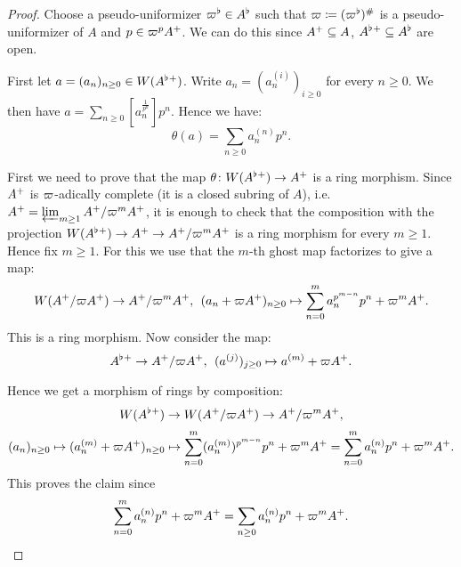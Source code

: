 \begin{proof}
Choose a pseudo-uniformizer $\varpi^{\flat}\in A^{\flat}$ such that $\varpi\coloneqq (\varpi^{\flat})^{\#}$ is a pseudo-uniformizer of $A$ and $p\in\varpi^pA{^{+}}$.
We can do this since $A{^{+}}\subseteq A$, $A^{\flat}{^{+}}\subseteq A^{\flat}$ are open.

First let $a=(a_n)_{n\geq0}\in W(A^{\flat}{^{+}})$. Write $a_n = (a_n^{(i)})_{i\geq0}$ for every $n\geq0$. 
We then have $a=\sum_{n\geq0}[a_n^{\frac{1}{p^n}}]p^n.$
Hence we have:
\[\theta(a)=\sum_{n\geq0}a_n^{(n)}p^n.\]


First we need to prove that the map $\theta\colon W(A^{\flat}{^{+}})\to A{^{+}}$ is a ring morphism.
Since $A{^{+}}$ is $\varpi$-adically complete (it is a closed subring of $A$), i.e. $A{^{+}}=\varprojlim_{m\geq1}A{^{+}}/\varpi^m A{^{+}}$, it is enough to check that the composition with the projection $W(A^{\flat}{^{+}})\to A{^{+}}\to A{^{+}}/\varpi^m A{^{+}}$ is a ring morphism for every $m\geq1$. Hence fix $m\geq1$.
For this we use that the $m$-th ghost map factorizes to give a map:
\[W(A{^{+}}/\varpi A{^{+}})\to A{^{+}}/\varpi^mA{^{+}},\:\:(a_n+\varpi A{^{+}})_{n\geq0}\mapsto\sum_{n=0}^{m}a_n^{p^{m-n}}p^n + \varpi^mA{^{+}}.\]
This is a ring morphism.
Now consider the map:
\[A^{\flat}{^{+}}\to A{^{+}}/\varpi A{^{+}},\:\:(a^{(j)})_{j\geq0}\mapsto a^{(m)} + \varpi A{^{+}}.\]

Hence we get a morphism of rings by composition:
\[W(A^{\flat}{^{+}})\to W(A{^{+}}/\varpi A{^{+}})\to A{^{+}}/\varpi^mA{^{+}},\]
\[(a_n)_{n\geq0}\mapsto (a_n^{(m)}+\varpi A{^{+}})_{n\geq0}\mapsto \sum_{n=0}^{m}(a_n^{(m)})^{p^{m-n}}p^n +\varpi^mA{^{+}} = 
\sum_{n=0}^{m}a_n^{(n)}p^n + \varpi^mA{^{+}}.\]
This proves the claim since 
\[\sum_{n=0}^{m}a_n^{(n)}p^n + \varpi^mA{^{+}} = \sum_{n\geq0}a_n^{(n)}p^n + \varpi^mA{^{+}}.\]



\end{proof}
